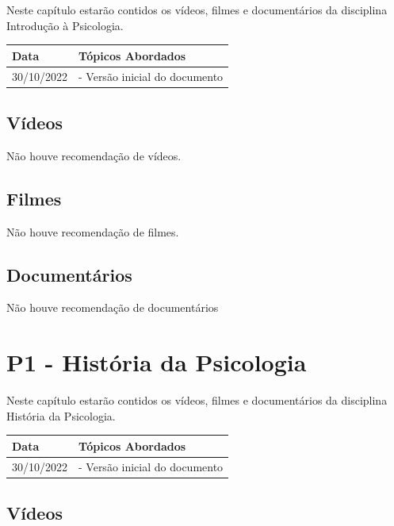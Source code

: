\documentclass[
]{book}
\begin{document}
Neste capítulo estarão contidos os vídeos, filmes e documentários da disciplina Introdução à Psicologia.

\begin{longtable}[]{@{}ll@{}}
\toprule()
Data & Tópicos Abordados \\
\midrule()
\endhead
30/10/2022 & - Versão inicial do documento \\
\bottomrule()
\end{longtable}

\hypertarget{vuxeddeos-1}{%
\section{Vídeos}\label{vuxeddeos-1}}

Não houve recomendação de vídeos.

\hypertarget{filmes-1}{%
\section{Filmes}\label{filmes-1}}

Não houve recomendação de filmes.

\hypertarget{documentuxe1rios-1}{%
\section{Documentários}\label{documentuxe1rios-1}}

Não houve recomendação de documentários

\hypertarget{p1---histuxf3ria-da-psicologia}{%
\chapter{P1 - História da Psicologia}\label{p1---histuxf3ria-da-psicologia}}

Neste capítulo estarão contidos os vídeos, filmes e documentários da disciplina História da Psicologia.

\begin{longtable}[]{@{}ll@{}}
\toprule()
Data & Tópicos Abordados \\
\midrule()
\endhead
30/10/2022 & - Versão inicial do documento \\
\bottomrule()
\end{longtable}

\hypertarget{vuxeddeos-2}{%
\section{Vídeos}\label{vuxeddeos-2}}
\end{document}
